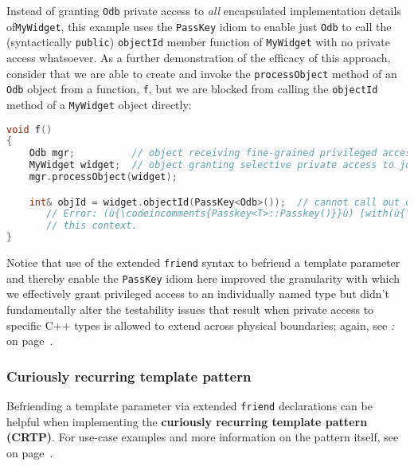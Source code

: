 \noindent Instead of granting \texttt{Odb} private access to \emph{all}
encapsulated implementation details of\linebreak[4] \mbox{\texttt{MyWidget}}, this example
uses the \texttt{PassKey} idiom to enable just \texttt{Odb} to call the
(syntactically \texttt{public}) \texttt{objectId} member function of
\texttt{MyWidget} with no private access whatsoever. As a further
demonstration of the efficacy of this approach, consider that we are
able to create and invoke the \texttt{processObject} method of an
\texttt{Odb} object from a function, \texttt{f}, but we are blocked from
calling the \texttt{objectId} method of a \texttt{MyWidget} object
directly:

\begin{lstlisting}[language=C++]
void f()
{
    Odb mgr;          // object receiving fine-grained privileged access
    MyWidget widget;  // object granting selective private access to just (ù{\codeincomments{Odb}}ù)
    mgr.processObject(widget);

    int& objId = widget.objectId(PassKey<Odb>());  // cannot call out of (ù{\codeincomments{Odb}}ù)
       // Error: (ù{\codeincomments{Passkey<T>::Passkey()}}ù) [with(ù{\codeincomments{T}}ù) = (ù{\codeincomments{Odb}}ù)] is private within
       // this context.
}
\end{lstlisting}

\noindent Notice that use of the extended \texttt{friend} syntax to befriend a
template parameter and thereby enable the \texttt{PassKey} idiom here
improved the granularity with which we effectively grant privileged
access to an individually named type but didn't fundamentally alter the
testability issues that result when private access to specific C++
types is allowed to extend across physical boundaries; again, see
\textit{: } on page~\pageref{long-distance-friendship}.

\subsubsection[Curiously recurring template pattern]{Curiously recurring template pattern}\label{curiously-recurring-template-pattern}

Befriending a template parameter via extended \texttt{friend}
declarations can be helpful when implementing the \textbf{curiously
recurring template pattern (CRTP)}. For use-case examples and more
information on the pattern itself, see \textit{} on page~\pageref{appendix:-crtp-use-cases}.

